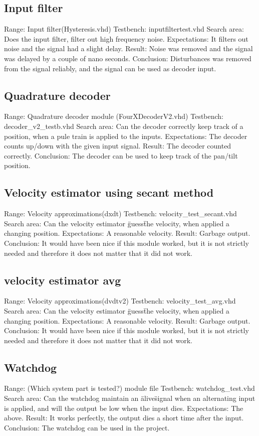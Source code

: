 \subsection{Input filter}
Range:                  Input filter(Hysteresis.vhd)
Testbench: 				inputfiltertest.vhd
Search area:            Does the input filter, filter out high frequency noise.
Expectations:           It filters out noise and the signal had a slight delay.
Result:                 Noise was removed and the signal was delayed by a couple of nano seconds.
Conclusion:             Disturbances was removed from the signal reliably, and the signal can be used as decoder input.

\subsection{Quadrature decoder}
Range:                  Quadrature decoder module (FourXDecoderV2.vhd)
Testbench: 				decoder\_v2\_testb.vhd
Search area:            Can the decoder correctly keep track of a position, when a pule train is applied to the inputs.	
Expectations:           The decoder counts up/down with the given input signal.
Result:                 The decoder counted correctly.
Conclusion:             The decoder can be used to keep track of the pan/tilt position.

\subsection{Velocity estimator using secant method}
Range:                  Velocity approximations(dxdt)
Testbench: 				velocity\_test\_secant.vhd
Search area:            Can the velocity estimator \"guess\" the velocity, when applied a changing position.	
Expectations:           A reasonable velocity.
Result:                 Garbage output.
Conclusion:             It would have been nice if this module worked, but it is not strictly needed and therefore it does not matter that it did not work.

\subsection{velocity estimator avg}
Range:                  Velocity approximations(dvdtv2)
Testbench: 				velocity\_test\_avg.vhd
Search area:            Can the velocity estimator \"guess\" the velocity, when applied a changing position.
Expectations:           A reasonable velocity.
Result:                 Garbage output.
Conclusion:             It would have been nice if this module worked, but it is not strictly needed and therefore it does not matter that it did not work.

\subsection{Watchdog}
Range:                  (Which system part is tested?) module file
Testbench: 				watchdog\_test.vhd
Search area:            Can the watchdog maintain an \"alive\" signal when an alternating input is applied, and will the output be low when the input dies.
Expectations:           The above.
Result:                 It works perfectly, the output dies a short time after the input.
Conclusion:             The watchdog can be used in the project.
